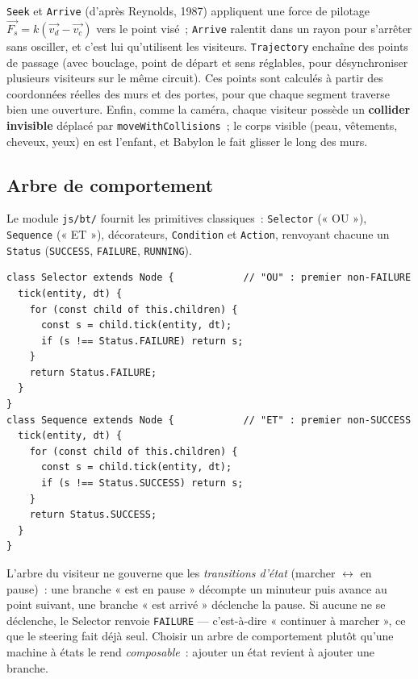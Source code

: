 \documentclass[11pt,a4paper]{article}
\begin{document}
\texttt{Seek} et \texttt{Arrive} (d'après Reynolds, 1987) appliquent une force de
pilotage $\vec{F_s}=k(\vec{v_d}-\vec{v_c})$ vers le point visé~; \texttt{Arrive}
ralentit dans un rayon pour s'arrêter sans osciller, et c'est lui qu'utilisent les
visiteurs. \texttt{Trajectory} enchaîne des points de passage (avec bouclage,
point de départ et sens réglables, pour désynchroniser plusieurs visiteurs sur le
même circuit). Ces points sont calculés à partir des coordonnées réelles des murs
et des portes, pour que chaque segment traverse bien une ouverture. Enfin, comme
la caméra, chaque visiteur possède un \textbf{collider invisible} déplacé par
\texttt{moveWithCollisions}~; le corps visible (peau, vêtements, cheveux, yeux)
en est l'enfant, et Babylon le fait glisser le long des murs.

\subsection{Arbre de comportement}

Le module \texttt{js/bt/} fournit les primitives classiques~: \texttt{Selector}
(« OU »), \texttt{Sequence} (« ET »), décorateurs, \texttt{Condition} et
\texttt{Action}, renvoyant chacune un \texttt{Status} (\texttt{SUCCESS},
\texttt{FAILURE}, \texttt{RUNNING}).

\begin{lstlisting}[caption={Noeuds composites Selector et Sequence (js/bt/behaviorTree.js).},label=lst:bt]
class Selector extends Node {            // "OU" : premier non-FAILURE
  tick(entity, dt) {
    for (const child of this.children) {
      const s = child.tick(entity, dt);
      if (s !== Status.FAILURE) return s;
    }
    return Status.FAILURE;
  }
}
class Sequence extends Node {            // "ET" : premier non-SUCCESS
  tick(entity, dt) {
    for (const child of this.children) {
      const s = child.tick(entity, dt);
      if (s !== Status.SUCCESS) return s;
    }
    return Status.SUCCESS;
  }
}
\end{lstlisting}

L'arbre du visiteur ne gouverne que les \emph{transitions d'état} (marcher
$\leftrightarrow$ en pause)~: une branche « est en pause » décompte un minuteur
puis avance au point suivant, une branche « est arrivé » déclenche la pause. Si
aucune ne se déclenche, le Selector renvoie \texttt{FAILURE} --- c'est-à-dire
« continuer à marcher », ce que le steering fait déjà seul. Choisir un arbre de
comportement plutôt qu'une machine à états le rend \emph{composable}~: ajouter un
état revient à ajouter une branche.
\end{document}
